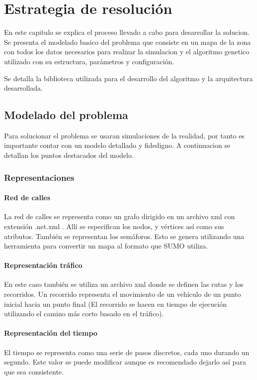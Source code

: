 \chapter{Estrategia de resolución}

En este capitulo se explica el proceso llevado a cabo para desarrollar la solucion. Se presenta el modelado basico del problema que consiste en un mapa de la zona con todos los datos necesarios para realizar la simulacion y el algoritmo genetico utilizado con su estructura, parámetros y configuración. 

Se detalla la biblioteca utilizada para el desarrollo del algoritmo y la arquitectura desarrollada.



\section{Modelado del problema }

Para solucionar el problema se usaran simulaciones de la realidad, por tanto es importante contar con un modelo detallado y fidedigno.
A continuacion se detallan los puntos destacados del modelo.




\subsection{Representaciones}

\subsubsection{Red de calles}
La red de calles se representa como un grafo dirigido en un archivo xml con extensión .net.xml . Allí se especifican los nodos, y vértices así como sus atributos. También se representan los semáforos. Esto  se genera utilizando una herramienta  para convertir un mapa al formato que SUMO utiliza.

\subsubsection{Representación tráfico}
En este caso también se utiliza un archivo xml donde se definen las rutas y los recorridos. Un recorrido representa el movimiento de un vehículo de un punto inicial hacia un punto final (El recorrido se hacen en tiempo de ejecución utilizando el camino más corto basado en el tráfico). 


\subsubsection{Representación del tiempo}
El tiempo se representa como una serie de pasos discretos, cada uno durando un segundo. Este valor se puede modificar aunque es recomendado dejarlo así para que sea consistente.


